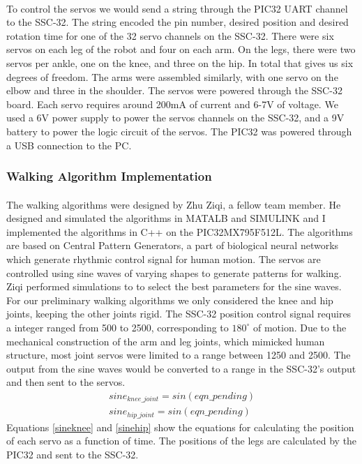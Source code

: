 \documentclass[letterpaper,12pt]{article}
\begin{document}
\paragraph{} To control the servos we would send a string through the PIC32 UART
channel to the SSC-32. The string encoded the pin number, desired position and
desired rotation time for one of the 32 servo channels on the
SSC-32\cite{sscdata}. There were six servos on each leg of the robot and four on
each arm. On the legs, there were two servos per ankle, one on the knee, and
three on the hip. In total that gives us six degrees of freedom.  The arms were
assembled similarly, with one servo on the elbow and three in the shoulder. The
servos were powered through the SSC-32 board. Each servo requires around 200mA
of current and 6-7V of voltage\cite{servodata}. We used a 6V power supply to
power the servos channels on the SSC-32, and a 9V battery to power the logic
circuit of the servos. The PIC32 was powered through a USB connection to the PC.

\subsubsection{Walking Algorithm Implementation} 
\paragraph{} The walking algorithms were designed by Zhu Ziqi, a fellow team
member. He designed and simulated the algorithms in MATALB and SIMULINK and I
implemented the algorithms in C++ on the PIC32MX795F512L. The algorithms are
based on Central Pattern Generators, a part of biological neural networks which
generate rhythmic control signal for human motion\cite{cpggeneral}. The servos
are controlled using sine waves of varying shapes to generate patterns for
walking. Ziqi performed simulations to to select the best parameters for the
sine waves. For our preliminary walking algorithms we only considered the knee
and hip joints, keeping the other joints rigid. The SSC-32 position control
signal requires a integer ranged from 500 to 2500, corresponding to
$180^{\circ}$ of motion\cite{sscdata}. Due to the mechanical construction of the
arm and leg joints, which mimicked human structure, most joint servos were
limited to a range between 1250 and 2500. The output from the sine waves would
be converted to a range in the SSC-32's output and then sent to the servos. 
\begin{align}
    sine_{knee\_joint}=sin(eqn\_pending) \label{sineknee}\\
    sine_{hip\_joint}=sin(eqn\_pending) \label{sinehip}
\end{align}
Equations \ref{sineknee} and \ref{sinehip} show the equations for calculating
the position of each servo as a function of time. The positions of the legs are
calculated by the PIC32 and sent to the SSC-32.
\end{document}
